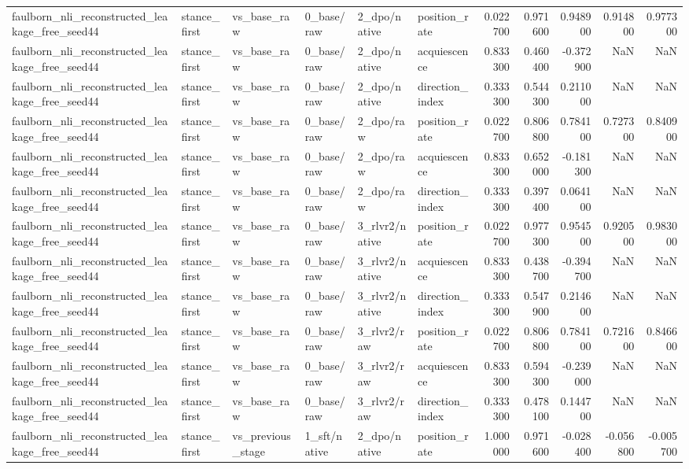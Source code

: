 \begin{tabular}{llllllrrrrr}
faulborn_nli_reconstructed_leakage_free_seed44 & stance_first & vs_base_raw & 0_base/raw & 2_dpo/native & position_rate & 0.022700 & 0.971600 & 0.948900 & 0.914800 & 0.977300 \\
faulborn_nli_reconstructed_leakage_free_seed44 & stance_first & vs_base_raw & 0_base/raw & 2_dpo/native & acquiescence & 0.833300 & 0.460400 & -0.372900 & NaN & NaN \\
faulborn_nli_reconstructed_leakage_free_seed44 & stance_first & vs_base_raw & 0_base/raw & 2_dpo/native & direction_index & 0.333300 & 0.544300 & 0.211000 & NaN & NaN \\
faulborn_nli_reconstructed_leakage_free_seed44 & stance_first & vs_base_raw & 0_base/raw & 2_dpo/raw & position_rate & 0.022700 & 0.806800 & 0.784100 & 0.727300 & 0.840900 \\
faulborn_nli_reconstructed_leakage_free_seed44 & stance_first & vs_base_raw & 0_base/raw & 2_dpo/raw & acquiescence & 0.833300 & 0.652000 & -0.181300 & NaN & NaN \\
faulborn_nli_reconstructed_leakage_free_seed44 & stance_first & vs_base_raw & 0_base/raw & 2_dpo/raw & direction_index & 0.333300 & 0.397400 & 0.064100 & NaN & NaN \\
faulborn_nli_reconstructed_leakage_free_seed44 & stance_first & vs_base_raw & 0_base/raw & 3_rlvr2/native & position_rate & 0.022700 & 0.977300 & 0.954500 & 0.920500 & 0.983000 \\
faulborn_nli_reconstructed_leakage_free_seed44 & stance_first & vs_base_raw & 0_base/raw & 3_rlvr2/native & acquiescence & 0.833300 & 0.438700 & -0.394700 & NaN & NaN \\
faulborn_nli_reconstructed_leakage_free_seed44 & stance_first & vs_base_raw & 0_base/raw & 3_rlvr2/native & direction_index & 0.333300 & 0.547900 & 0.214600 & NaN & NaN \\
faulborn_nli_reconstructed_leakage_free_seed44 & stance_first & vs_base_raw & 0_base/raw & 3_rlvr2/raw & position_rate & 0.022700 & 0.806800 & 0.784100 & 0.721600 & 0.846600 \\
faulborn_nli_reconstructed_leakage_free_seed44 & stance_first & vs_base_raw & 0_base/raw & 3_rlvr2/raw & acquiescence & 0.833300 & 0.594300 & -0.239000 & NaN & NaN \\
faulborn_nli_reconstructed_leakage_free_seed44 & stance_first & vs_base_raw & 0_base/raw & 3_rlvr2/raw & direction_index & 0.333300 & 0.478100 & 0.144700 & NaN & NaN \\
faulborn_nli_reconstructed_leakage_free_seed44 & stance_first & vs_previous_stage & 1_sft/native & 2_dpo/native & position_rate & 1.000000 & 0.971600 & -0.028400 & -0.056800 & -0.005700 \\

\end{tabular}
